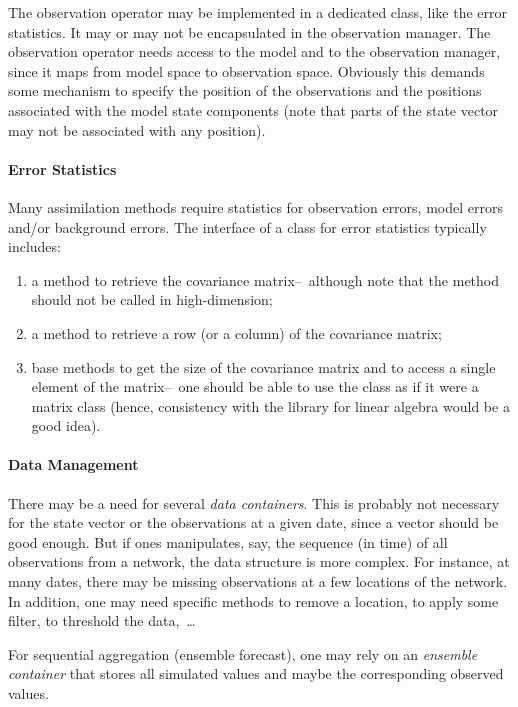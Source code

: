 \documentclass{tufte-book}
\begin{document}
The observation operator may be implemented in a dedicated class, like the error
statistics. It may or may not be encapsulated in the observation manager. The
observation operator needs access to the model and to the observation
manager, since it maps from model space to observation space. Obviously this
demands some mechanism to specify the position of the observations and the
positions associated with the model state components (note that parts of the
state vector may not be associated with any position).

\paragraph{Error Statistics}
\label{sec:error_statistics}

Many assimilation methods require statistics for observation errors, model
errors and/or background errors. The interface of a class for error statistics
typically includes:
\begin{enumerate}
\item a method to retrieve the covariance matrix--~although note that the method should not be
 called in high-dimension;
\item a method to retrieve a row (or a column) of the covariance matrix;
\item base methods to get the size of the covariance matrix and to access a
 single element of the matrix--~one should be able to use the class as if it
 were a matrix class (hence, consistency with the library for linear algebra
 would be a good idea).
\end{enumerate}

\paragraph{Data Management}

There may be a need for several {\it data containers}. This is probably not
necessary for the state vector or the observations at a given date, since a
vector should be good enough. But if ones manipulates, say, the sequence (in
time) of all observations from a network, the data structure is more
complex. For instance, at many dates, there may be missing observations at a
few locations of the network. In addition, one may need specific methods to
remove a location, to apply some filter, to threshold the data,~\ldots{}

For sequential aggregation (ensemble forecast), one may rely on an {\it
 ensemble container} that stores all simulated values and maybe the
corresponding observed values.
\end{document}
